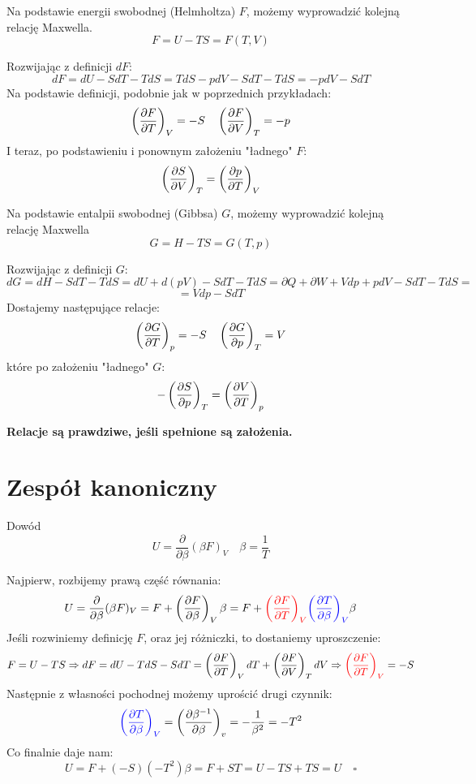 \documentclass{../notatki}
\begin{document}
\begin{examplebox}
  Na podstawie energii swobodnej (Helmholtza) $F$, możemy wyprowadzić kolejną
  relację Maxwella.
  $$
  F = U - TS = F(T, V)
  $$

  \vspace{1em}
  Rozwijając z definicji $dF$:
  $$
  dF = dU - SdT - TdS = TdS - pdV -SdT - TdS = -pdV - SdT
  $$
  Na podstawie definicji, podobnie jak w poprzednich przykładach:
  $$
  \left(\frac{\partial F}{\partial T}\right)_V = -S \quad \left(\frac{\partial F}{\partial V}\right)_T = -p
  $$
  I teraz, po podstawieniu i ponownym założeniu "ładnego" $F$:
  $$
  \left(\frac{\partial S}{\partial V}\right)_T = \left(\frac{\partial p}{\partial T}\right)_V
  $$
\end{examplebox}

\begin{examplebox}
  Na podstawie entalpii swobodnej (Gibbsa) $G$, możemy wyprowadzić
  kolejną relację
  Maxwella
  $$
  G = H - TS = G(T, p)
  $$

  \vspace{1em}
  Rozwijając z definicji $G$:
  $$
  dG = dH - SdT - TdS = dU + d(pV) - SdT - TdS = \partial Q + \partial W + Vdp +
  pdV - SdT - TdS =
  $$
  $$
  = Vdp - SdT
  $$
  Dostajemy następujące relacje:
  $$
  \left(\frac{\partial G}{\partial T}\right)_p = -S \quad \left(\frac{\partial G}{\partial p}\right)_T = V
  $$
  które po założeniu "ładnego" $G$:
  $$
  -\left(\frac{\partial S}{\partial p}\right)_T = \left(\frac{\partial V}{\partial T}\right)_p
  $$
\end{examplebox}

\textbf{Relacje są prawdziwe, jeśli spełnione są założenia.}

\section{Zespół kanoniczny}

\begin{examplebox}
  Dowód
  $$
  U = \frac{\partial}{\partial \beta} (\beta F)_V \quad \beta = \frac{1}{T}
  $$

  \vspace{1em}
  Najpierw, rozbijemy prawą część równania:
  $$
  U = \frac{\partial}{\partial \beta} (\beta F)_V = F +
  \left(\frac{\partial F}{\partial \beta}\right)_V  \beta = F + \textcolor{red}{\left(\frac{\partial F}{\partial T}\right)_V}
  \textcolor{blue}{\left(\frac{\partial T}{\partial \beta}\right)_V} \beta
  $$
  Jeśli rozwiniemy definicję $F$, oraz jej różniczki, to dostaniemy
  uproszczenie:
  $$
  F=U-TS \Rightarrow dF = dU - TdS - SdT = \left(\frac{\partial F}{\partial T}\right)_V dT +
  \left(\frac{\partial F}{\partial V}\right)_T dV \Rightarrow \textcolor{red}{\left(\frac{\partial F}{\partial T}\right)_V} = -S
  $$
  Następnie z własności pochodnej możemy uprościć drugi czynnik:
  $$
  \textcolor{blue}{\left(\frac{\partial T}{\partial \beta}\right)_V} = \left(\frac{\partial \beta^{-1}}{\partial \beta}\right)_v
  = - \frac{1}{\beta ^2} = -T^2
  $$
  Co finalnie daje nam:
  $$
  U = F + (-S)(-T^2)\beta = F + ST = U - TS + TS = U \quad \square
  $$
\end{examplebox}
\end{document}
